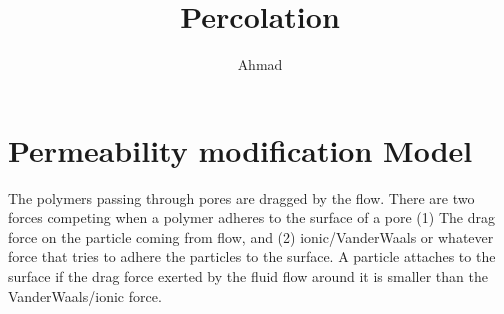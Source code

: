 
\def\d{\text{d}}
\def\vep{\varepsilon}
\def\ep{\epsilon}
\def\la{\langle}
\def\ra{\rangle}
\def\th{\theta}


\title{Percolation}
\author{Ahmad}
          
\maketitle


\section{Permeability modification Model}
%
The polymers passing through pores are dragged by the flow. There are
two forces competing when a polymer adheres to the surface of a pore
(1) The drag force on the particle coming from flow, and (2)
ionic/VanderWaals or whatever force that tries to adhere the particles
to the surface. A particle attaches to the surface if the drag force
exerted by the fluid flow around it is smaller than the
VanderWaals/ionic force.

